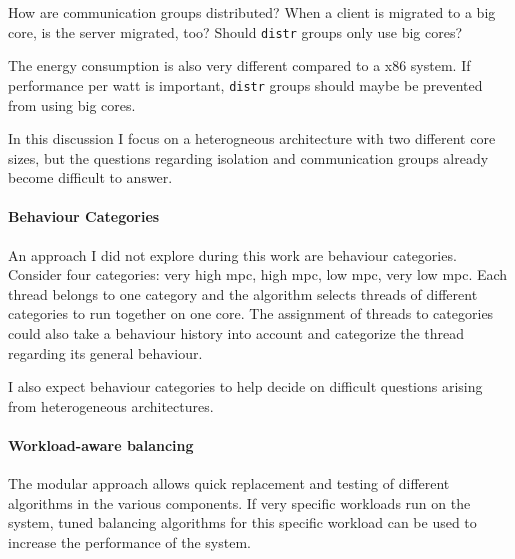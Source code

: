 How are communication groups distributed?
When a client is migrated to a big core, is the server migrated, too?
Should \texttt{distr} groups only use big cores?

The energy consumption is also very different compared to a x86 system.
If performance per watt is important, \texttt{distr} groups should maybe be
prevented from using big cores.

In this discussion I focus on a heterogneous architecture with two different
core sizes, but the questions regarding isolation and communication groups
already become difficult to answer.



\paragraph{Behaviour Categories}
An approach I did not explore during this work are behaviour categories.
Consider four categories: very high \gls{mpc}, high \gls{mpc}, low \gls{mpc},
very low \gls{mpc}.
Each thread belongs to one category and the algorithm selects threads of
different categories to run together on one core.
The assignment of threads to categories could also take a behaviour history
into account and categorize the thread regarding its general behaviour.

I also expect behaviour categories to help decide on difficult questions
arising from heterogeneous architectures.


\paragraph{Workload-aware balancing}
The modular approach allows quick replacement and testing of different
algorithms in the various components.
If very specific workloads run on the system, tuned balancing algorithms for
this specific workload can be used to increase the performance of the system.


\cleardoublepage

